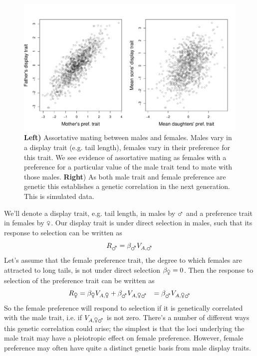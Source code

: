 \begin{figure}
\begin{center}
\includegraphics[width=\textwidth]{figures/Response_to_sel/Genetic_corr_assort_mating.pdf}
\end{center} \label{fig:assort_mating_2_trait}
\caption{{\bf Left)} Assortative mating between males and
  females. Males vary in a display trait (e.g. tail length), females
  vary in their preference for this trait. We see evidence of
  assortative mating as females with a preference for a particular
  value of the male trait tend to mate with those males. {\bf Right}) As both
  male trait and female preference are genetic this establishes a
  genetic correlation in the next generation. This is simulated data. } \label{fig:assort_mating_2_trait}
\end{figure}


We'll denote a display trait, e.g. tail length, in males by $\mars$ and a preference
trait in females by $\venus$. Our display trait is under direct selection in males, such that its response to selection can be written as
\begin{equation}
R_{\mars} = \beta_{\mars} V_{A, \mars}
\end{equation}
Let's assume that the female preference trait, the degree to which
females are attracted to long tails, is not under direct
selection $\beta_{\venus}=0$. Then the response to selection of the
preference trait can be written as
\begin{eqnarray}
R_{\venus} &=\beta_{\venus}V_{A,\venus}  + \beta_{\mars} V_{A, \venus
  \mars}
& = \beta_{\mars} V_{A, \venus  \mars}
\end{eqnarray}
So the female preference will respond to selection if it is
genetically correlated with the male trait, i.e. if $V_{A, \venus
  \mars}$ is not zero. There's a number of different ways this genetic correlation could arise; the
simplest is that the loci underlying the male trait may have a
pleiotropic effect on female preference. However, female preference
may often have quite a distinct genetic basis from male display traits.

